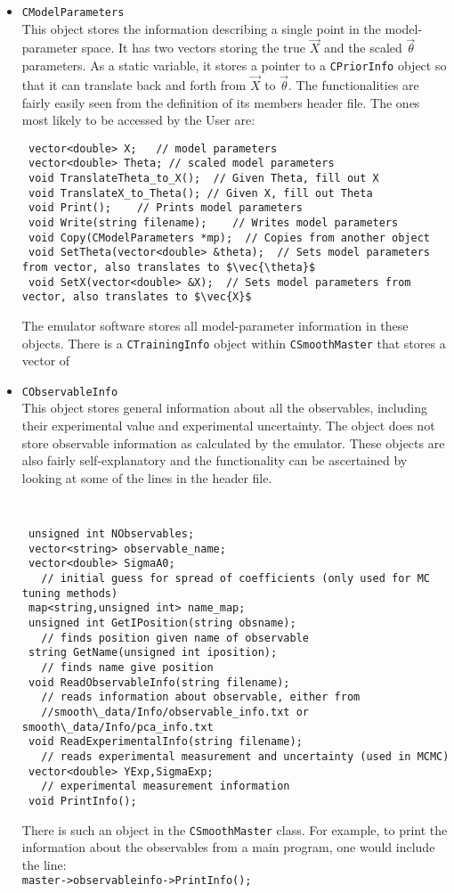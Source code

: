 \documentclass[UserManual.tex]{subfiles}
\begin{document}
\begin{itemize}
\item {\tt CModelParameters}\\
This object stores the information describing a single point in the model-parameter space. It has two vectors storing the true $\vec{X}$ and the scaled $\vec{\theta}$ parameters. As a static variable, it stores a pointer to a {\tt CPriorInfo} object so that it can translate back and forth from $\vec{X}$ to $\vec{\theta}$. The functionalities are fairly easily seen from the definition of its members header file. The ones most likely to be accessed by the User are:
{\tt\begin{verbatim}
 vector<double> X;   // model parameters
 vector<double> Theta; // scaled model parameters
 void TranslateTheta_to_X();  // Given Theta, fill out X
 void TranslateX_to_Theta(); // Given X, fill out Theta
 void Print();    // Prints model parameters
 void Write(string filename);    // Writes model parameters
 void Copy(CModelParameters *mp);  // Copies from another object
 void SetTheta(vector<double> &theta);  // Sets model parameters from vector, also translates to $\vec{\theta}$
 void SetX(vector<double> &X);  // Sets model parameters from vector, also translates to $\vec{X}$
\end{verbatim}}
The emulator software stores all model-parameter information in these objects. There is a {\tt CTrainingInfo} object within {\tt CSmoothMaster} that stores a vector of 

\item {\tt CObservableInfo}\\
This object stores general information about all the observables, including their experimental value and experimental uncertainty. The object does not store observable information as calculated by the emulator. These objects are also fairly self-explanatory and the functionality can be ascertained by looking at some of the lines in the header file. 
{\tt
\begin{verbatim}
 unsigned int NObservables;
 vector<string> observable_name;
 vector<double> SigmaA0;
   // initial guess for spread of coefficients (only used for MC tuning methods)
 map<string,unsigned int> name_map;
 unsigned int GetIPosition(string obsname);
   // finds position given name of observable
 string GetName(unsigned int iposition);
   // finds name give position
 void ReadObservableInfo(string filename);
   // reads information about observable, either from
   //smooth\_data/Info/observable_info.txt or smooth\_data/Info/pca_info.txt 
 void ReadExperimentalInfo(string filename);
   // reads experimental measurement and uncertainty (used in MCMC)
 vector<double> YExp,SigmaExp;
   // experimental measurement information
 void PrintInfo();
\end{verbatim}}

There is such an object in the {\tt CSmoothMaster} class. For example, to print the information about the observables from a main program, one would include the line:\\
 {\tt master->observableinfo->PrintInfo();}

\end{itemize}
\end{document}
